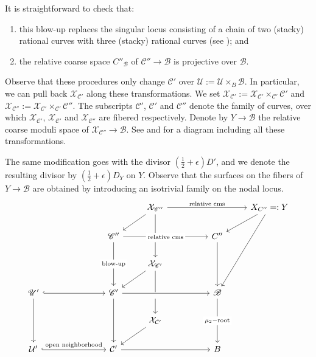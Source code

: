 \documentclass[a4paper,12pt]{amsart}
\newcommand{\sU}{{\mathscr{U}}}
\newcommand{\sC}{{\mathscr{C}}}
\newcommand{\sB}{{\mathscr{B}}}
\newcommand{\cX}{{\mathcal{X}}}
\newcommand{\cU}{{\mathcal{U}}}
\newcommand\cC{{\mathcal{C}}}
\theoremstyle{definition}
\theoremstyle{remark}
\begin{document}
 It is straightforward to check that:
 \begin{enumerate}
     \item this blow-up replaces the singular locus consisting of a chain of two (stacky) rational curves with three (stacky) rational curves (see ); and
     \item the relative coarse space $C''_{\sB}$ of $\sC''\rightarrow \sB$ is projective over $\sB$.
 \end{enumerate}
Observe that these procedures only change $\sC'$ over $\sU:=\cU\times_B\sB$. In particular, we can pull back $\cX_{\cC'}$ along these transformations. We set $\cX_{\sC'}:=\cX_{\cC'}\times_{\cC'}\sC'$ and $\cX_{\sC''}:=\cX_{\cC'}\times_{\cC'}\sC''$. The subscripts $\cC'$, $\sC'$ and $\sC''$ denote the family of curves, over which $\cX_{\cC'}$, $\cX_{\sC'}$ and $\cX_{\sC''}$ are fibered respectively. Denote by $Y\to \sB$ the relative coarse moduli space of $\cX_{\sC''}\to \sB$. See  and  for a diagram including all these transformations.


The same modification goes with the divisor $(\frac{1}{2}+\epsilon)D'$, and we denote the resulting divisor by $(\frac{1}{2}+\epsilon)D_Y$ on $Y$.
Observe that the surfaces on the fibers of $Y\to \sB$ are obtained by introducing an isotrivial family on the nodal locus.
\begin{equation}\label{diagram_root_stack}
    \begin{tikzcd}[ampersand replacement=\&]
	\&\&\&\& {\mathcal{X}_{\mathscr{C}''}} \&\&\& {X_{C''}=:Y} \\
	\&\&\& {\mathscr{C}''} \& {} \&\& {C''} \\
	\&\&\&\& {\mathcal{X}_{\mathscr{C}'}} \\
	{\mathscr{U}'} \&\&\& {\mathscr{C}'} \& {} \&\& {\mathscr{B}} \\
	\&\&\&\& {\mathcal{X}_{\cC'}} \\
	{\mathcal{U}'} \&\&\& {\mathcal{C}'} \&\&\& B
	\arrow["{\textup{relative cms}}", from=1-5, to=1-8]
	\arrow[from=1-5, to=2-4]
	\arrow[no head, from=1-5, to=2-5]
	\arrow[from=1-8, to=2-7]
	\arrow[from=1-8, to=4-7]
	\arrow["{\textup{relative cms}}"{description}, from=2-4, to=2-7]
	\arrow["{\textup{blow-up}}"{description}, from=2-4, to=4-4]
	\arrow[from=2-5, to=3-5]
	\arrow[from=2-7, to=4-7]
	\arrow[from=3-5, to=4-4]
	\arrow[no head, from=3-5, to=4-5]
	\arrow[hook, from=4-1, to=4-4]
	\arrow[from=4-1, to=6-1]
	\arrow[from=4-4, to=4-7]
	\arrow[from=4-4, to=6-4]
	\arrow[from=4-5, to=5-5]
	\arrow["{\mu_2-\textup{root}}"{description}, from=4-7, to=6-7]
	\arrow[from=5-5, to=6-4]
	\arrow["{\textup{open neighborhood}}", hook, from=6-1, to=6-4]
	\arrow[from=6-4, to=6-7]
\end{tikzcd}
\end{equation}
\end{document}
